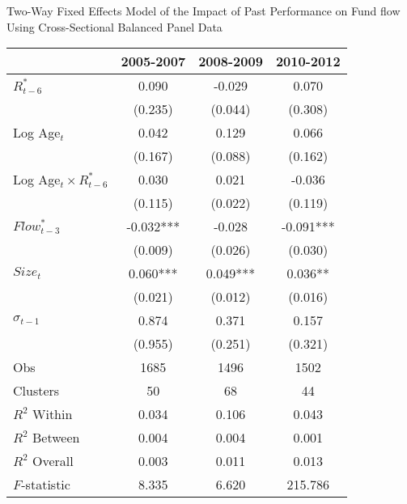 {
\def\sym#1{\ifmmode^{#1}\else\(^{#1}\)\fi}
\begin{center}
      \begin{threeparttable}
      \caption{Two-Way Fixed Effects Model of the Impact of Past Performance on Fund flow Using Cross-Sectional Balanced Panel Data}
      \label{table:robust}
      \def\arraystretch{1.5}
      \singlespacing
\begin{tabular}{l*{3}{c}}
\hline\hline
&\multicolumn{1}{c}{2005-2007}&\multicolumn{1}{c}{2008-2009}&\multicolumn{1}{c}{2010-2012}\\
\hline
$R^*_{t-6}$ &       0.090   &      -0.029   &       0.070   \\[-0.2cm]
            &     (0.235)   &     (0.044)   &     (0.308)   \\
[1em]
Log Age$_t$     &       0.042   &       0.129   &       0.066   \\[-0.2cm]
            &     (0.167)   &     (0.088)   &     (0.162)   \\
[1em]
Log Age$_t \times R^*_{t-6}$  & 0.030 & 0.021 & -0.036 \\[-0.2cm]
& (0.115) & (0.022) & (0.119)\\
$Flow^*_{t-3}$&      -0.032***&      -0.028   &      -0.091***\\[-0.2cm]
            &     (0.009)   &     (0.026)   &     (0.030)   \\
[1em]
$Size_t$     &       0.060***&       0.049***&       0.036** \\[-0.2cm]
            &     (0.021)   &     (0.012)   &     (0.016)   \\
[1em]
$\sigma_{t-1}$&       0.874   &       0.371   &       0.157   \\[-0.2cm]
            &     (0.955)   &     (0.251)   &     (0.321)   \\
\hline
Obs      &        1685   &        1496   &        1502   \\
Clusters    &          50   &          68   &          44   \\
$R^2$ Within        &       0.034   &       0.106   &       0.043   \\
$R^2$ Between        &       0.004   &       0.004   &       0.001   \\
$R^2$ Overall       &       0.003   &       0.011   &       0.013   \\
$F$-statistic          &       8.335   &       6.620   &     215.786   \\
\hline\hline
\end{tabular}

\end{threeparttable}
\end{center}}
